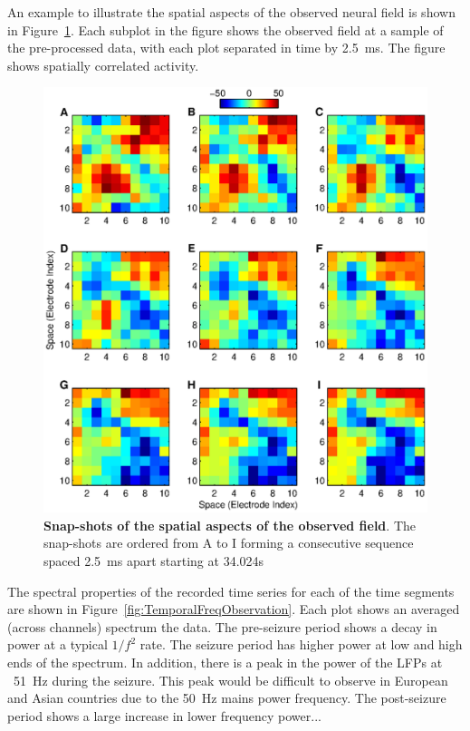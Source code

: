 \documentclass[]{article}
\begin{document}
An example to illustrate the spatial aspects of the observed neural field is shown in Figure~\ref{fig:FieldObserations}. Each subplot in the figure shows the observed field at a sample of the pre-processed data, with each plot separated in time by 2.5~ms. The figure shows spatially correlated activity.

\begin{figure}[!ht]
\begin{center}
\includegraphics{./Figures/FieldObservations.eps}
\end{center}
\caption{{\bf Snap-shots of the spatial aspects of the observed field}. The snap-shots are ordered from A to I forming a consecutive sequence spaced 2.5~ms apart starting at 34.024s}
\label{fig:FieldObserations}
\end{figure}

The spectral properties of the recorded time series for each of the time segments are shown in Figure~\ref{fig:TemporalFreqObservation}. Each plot shows an averaged (across channels) spectrum the data. The pre-seizure period shows a decay in power at a typical $1/f^2$ rate. The seizure period has higher power at low and high ends of the spectrum. In addition, there is a peak in the power of the LFPs at ~51~Hz during the seizure. This peak would be difficult to observe in European and Asian countries due to the 50~Hz mains power frequency. The post-seizure period shows a large increase in lower frequency power...
 
\end{document}
